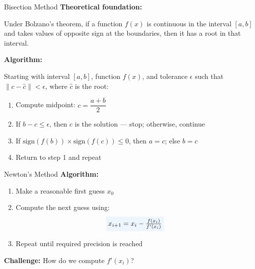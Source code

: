 \documentclass[aspectratio=169]{beamer}
\newcommand{\highlight}[2]{\colorbox{#1!9}{$#2$}}
\begin{document}
\begin{frame}{Bisection Method}
    \textcolor{accentcolor}{\textbf{Theoretical foundation:}}
    
    \small
    Under Bolzano's theorem, if a function $f(x)$ is continuous in the interval $[a, b]$ and takes values of opposite sign at the boundaries, then it has a root in that interval.
    
    \vspace{0.5em}
    
    \normalsize
    \textcolor{accentcolor}{\textbf{Algorithm:}}
    
    \small
    Starting with interval $[a, b]$, function $f(x)$, and tolerance $\epsilon$ such that $\|c - \hat{c}\| < \epsilon$, where $\hat{c}$ is the root:
    
    \vspace{0.3em}
    
    \begin{enumerate}
        \item Compute midpoint: $c = \dfrac{a+b}{2}$
            
        \item If $b-c \leq \epsilon$, then $c$ is the solution — stop; otherwise, continue
            
        \item If $\text{sign}(f(b)) \times \text{sign}(f(c)) \leq 0$, then $a = c$; else $b = c$
        
        \item Return to step 1 and repeat
   \end{enumerate}
\end{frame}

\begin{frame}{Newton's Method}
    \textcolor{accentcolor}{\textbf{Algorithm:}}
    
    \begin{enumerate}
        \item Make a reasonable first guess $x_{0}$
        
        \item Compute the next guess using:
        \begin{equation*}
            \highlight{accentcolor}{x_{i+1} = x_{i} - \frac{f(x_{i})}{f'(x_{i})}}
        \end{equation*}
        
        \item Repeat until required precision is reached
    \end{enumerate}
    
    \vspace{1em}
    \centering
    \alert{\textbf{Challenge:}} How do we compute $f'(x_{i})$?
\end{frame}
\end{document}
